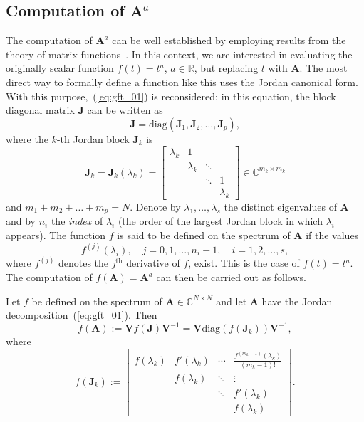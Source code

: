 \subsection{Computation of $\mathbf{A}^{{a}}$}\label{subsec:comp}
The computation of $\mathbf{A}^a$ can be well established by employing results from the theory of matrix functions~\cite{higham2008functions}. In this context, we are interested in evaluating the originally scalar function $f(t)=t^a$, $a\in\mathbb{R}$, but replacing $t$ with $\mathbf{A}$. The most direct way to formally define a function like this uses the Jordan canonical form. With this purpose,~(\ref{eq:gft_01}) is reconsidered; in this equation, the block diagonal matrix $\mathbf{J}$ can be written as
\begin{equation}\label{eq:jcf}
    \mathbf{J}=\textrm{diag}(\mathbf{J}_1,\mathbf{J}_2,\ldots,\mathbf{J}_p),
\end{equation}
where the $k$-th Jordan block $\mathbf{J}_k$ is
\begin{equation}
    \mathbf{J}_k=\mathbf{J}_k(\lambda_k)=\left[\begin{array}{cccc}
    \lambda_k&1&&\\
    &\lambda_k&\ddots &\\
    &&\ddots & 1\\
    &&&\lambda_k
    \end{array}\right]\in\mathbb{C}^{m_k\times m_k}
\end{equation}
and $m_1+m_2+\ldots +m_p=N$. Denote by $\lambda_1,\ldots,\lambda_s$ the distinct eigenvalues of $\mathbf{A}$ and by $n_i$ the \emph{index} of $\lambda_i$ (the order of the largest Jordan block in which $\lambda_i$ appears). The function $f$ is said to be defined on the spectrum of $\mathbf{A}$ if the values
\begin{equation}\label{eq:defspec}
    f^{(j)}(\lambda_i),\quad j=0,1,\ldots,n_i-1,\quad i=1,2,\ldots,s,
\end{equation}
where $f^{(j)}$ denotes the $j^{\textrm{th}}$ derivative of $f$, exist. This is the case of $f(t)=t^a$. The computation of $f(\mathbf{A})=\mathbf{A}^a$ can then be carried out as follows.
\vspace{0.2cm}
\begin{definition}\label{def:jc01}
Let $f$ be defined on the spectrum of $\mathbf{A}\in\mathbb{C}^{N\times N}$ and let $\mathbf{A}$ have the Jordan decomposition~(\ref{eq:gft_01}). Then
\begin{equation}\label{eq:jcf01}
    f(\mathbf{A}):=\mathbf{V}f(\mathbf{J})\mathbf{V}^{-1}=\mathbf{V}\textrm{diag}(f(\mathbf{J}_k))\mathbf{V}^{-1},
\end{equation}
where
\begin{equation}\label{eq:jcf02}
    f(\mathbf{J}_k):=\left[\begin{array}{cccc}
    f(\lambda_k)&f'(\lambda_k)&\cdots &\frac{f^{(m_k-1)}(\lambda_k)}{(m_k-1)!}\\
    &f(\lambda_k)&\ddots &\vdots\\
    &&\ddots & f'(\lambda_k)\\
    &&&f(\lambda_k)\end{array}\right].
\end{equation}
\end{definition}
